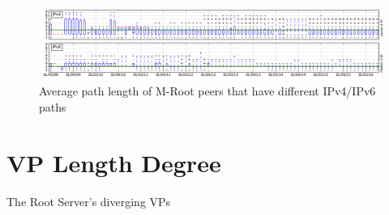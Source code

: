 \begin{appendices}
\begin{figure}[!htb]
			\label{fig:path-avg-diff-l}
		\end{figure}
		\begin{figure}[!htb]
			\centering
			\includegraphics[width=6.0in]{img/path_avg_diff_m.png}
			\caption{Average path length of M-Root peers that have different IPv4/IPv6 paths}
			\label{fig:path-avg-diff-m}
		\end{figure}	
	
	\chapter{VP Length Degree}
	\label{app:peer-degree-dist}
	The Root Server's diverging VPs 
	

\end{appendices}
